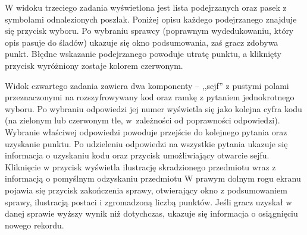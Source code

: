         W widoku trzeciego zadania wyświetlona jest lista podejrzanych oraz pasek z symbolami odnalezionych poszlak.
        Poniżej opisu każdego podejrzanego znajduje się przycisk wyboru.
        Po wybraniu sprawcy (poprawnym wydedukowaniu, który opis pasuje do śladów) ukazuje się okno podsumowania, zaś gracz zdobywa punkt.
        Błędne wskazanie podejrzanego powoduje utratę punktu, a kliknięty przycisk wyróżniony zostaje kolorem czerwonym.
        
        Widok czwartego zadania zawiera dwa komponenty -- ,,sejf'' z pustymi polami przeznaczonymi na rozszyfrowywany kod oraz ramkę z pytaniem jednokrotnego wyboru.
        Po wybraniu odpowiedzi jej numer wyświetla się jako kolejna cyfra kodu (na zielonym lub czerwonym tle, w~zależności od poprawności odpowiedzi).
        Wybranie właściwej odpowiedzi powoduje przejście do kolejnego pytania oraz uzyskanie punktu.
        Po udzieleniu odpowiedzi na wszystkie pytania ukazuje się informacja o uzyskaniu kodu oraz przycisk umożliwiający otwarcie sejfu.
        Kliknięcie w przycisk wyświetla ilustrację skradzionego przedmiotu wraz z informacją o pomyślnym odzyskaniu przedmiotu
        W prawym dolnym rogu ekranu pojawia się przycisk zakończenia sprawy, otwierający okno z podsumowaniem sprawy, ilustracją postaci i zgromadzoną liczbą punktów.
        Jeśli gracz uzyskał w danej sprawie wyższy wynik niż dotychczas, ukazuje się informacja o osiągnięciu nowego rekordu.
        
